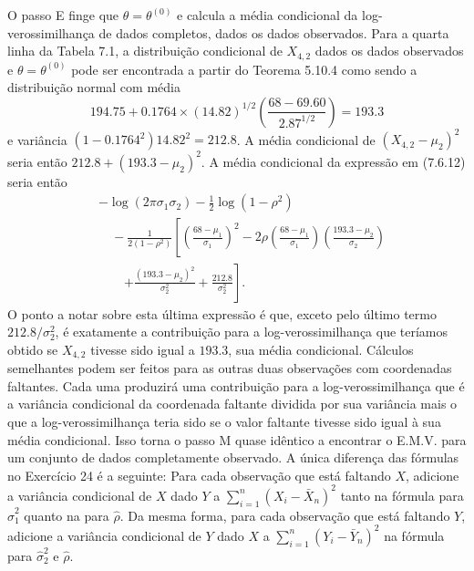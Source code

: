 O passo E finge que $\theta = \theta^{(0)}$ e calcula a média condicional da log-verossimilhança de dados completos, dados os dados observados. Para a quarta linha da Tabela 7.1, a distribuição condicional de $X_{4,2}$ dados os dados observados e $\theta=\theta^{(0)}$ pode ser encontrada a partir do Teorema 5.10.4 como sendo a distribuição normal com média
$$ 194.75 + 0.1764 \times (14.82)^{1/2} \left( \frac{68-69.60}{2.87^{1/2}} \right) = 193.3 $$
e variância $(1-0.1764^2)14.82^2=212.8$. A média condicional de $(X_{4,2}-\mu_2)^2$ seria então $212.8 + (193.3 - \mu_2)^2$. A média condicional da expressão em (7.6.12) seria então
\begin{equation}
\begin{split}
& -\log(2\pi\sigma_1\sigma_2) - \frac{1}{2}\log(1-\rho^2) \\
& \quad - \frac{1}{2(1-\rho^2)}\left[ \left(\frac{68-\mu_1}{\sigma_1}\right)^2 - 2\rho\left(\frac{68-\mu_1}{\sigma_1}\right)\left(\frac{193.3-\mu_2}{\sigma_2}\right) \right. \\
& \qquad \left. + \frac{(193.3-\mu_2)^2}{\sigma_2^2} + \frac{212.8}{\sigma_2^2} \right].
\end{split}
\end{equation}
O ponto a notar sobre esta última expressão é que, exceto pelo último termo $212.8/\sigma_2^2$, é exatamente a contribuição para a log-verossimilhança que teríamos obtido se $X_{4,2}$ tivesse sido igual a $193.3$, sua média condicional. Cálculos semelhantes podem ser feitos para as outras duas observações com coordenadas faltantes. Cada uma produzirá uma contribuição para a log-verossimilhança que é a variância condicional da coordenada faltante dividida por sua variância mais o que a log-verossimilhança teria sido se o valor faltante tivesse sido igual à sua média condicional. Isso torna o passo M quase idêntico a encontrar o E.M.V. para um conjunto de dados completamente observado. A única diferença das fórmulas no Exercício 24 é a seguinte: Para cada observação que está faltando $X$, adicione a variância condicional de $X$ dado $Y$ a $\sum_{i=1}^{n}(X_i - \bar{X}_n)^2$ tanto na fórmula para $\hat{\sigma}_1^2$ quanto na para $\hat{\rho}$. Da mesma forma, para cada observação que está faltando $Y$, adicione a variância condicional de $Y$ dado $X$ a $\sum_{i=1}^{n}(Y_i - \bar{Y}_n)^2$ na fórmula para $\hat{\sigma}_2^2$ e $\hat{\rho}$.

